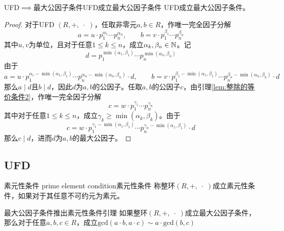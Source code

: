 \begin{lemma}{UFD$\implies$最大公因子条件}{UFD成立最大公因子条件}
	UFD成立最大公因子条件。
\end{lemma}

\begin{proof}
	对于UFD $(R,+,\;\cdot\;)$，任取非零元$a,b\in R$，作唯一完全因子分解
	$$
	a=u\cdot p_1^{\alpha_1}\cdots p_n^{\alpha_n},\qquad 
	b=v\cdot p_1^{\beta_1}\cdots p_n^{\beta_n}
	$$
	其中$u,v$为单位，且对于任意$1\le k\le n$，成立$\alpha_k,\beta_n\in\mathbb{N}$。记
	$$
	d=p_1^{\min(\alpha_1,\beta_1)}\cdots p_n^{\min(\alpha_n,\beta_n)}
	$$
	由于
	$$
	a=u\cdot p_1^{\alpha_1-\min(\alpha_1,\beta_1)}\cdots p_n^{\alpha_n-\min(\alpha_n,\beta_n)}\cdot d,\qquad 
	b=v\cdot p_1^{\beta_1-\min(\alpha_1,\beta_1)}\cdots p_n^{\beta_n-\min(\alpha_n,\beta_n)}\cdot d
	$$
	那么$a\mid d$且$b\mid d$，因此$d$为$a,b$的公因子。任取$a,b$的公因子$c$，由引理\ref{lem:整除的等价条件2}，作唯一完全因子分解
	$$
	c=w\cdot p_1^{\gamma_1}\cdots p_n^{\gamma_n}
	$$
	其中对于任意$1\le k\le n$，成立$\gamma_k\ge \min(\alpha_k,\beta_k)$。由于
	$$
	c=w\cdot p_1^{\gamma_1-\min(\alpha_1,\beta_1)}\cdots p_n^{\gamma_n-\min(\alpha_1,\beta_1)}\cdot d
	$$
	那么$c\mid d$，进而$d$为$a,b$的最大公因子。
\end{proof}

\subsection{UFD}

\begin{definition}{素元性条件 prime element condition}{素元性条件}
	称整环$(R,+,\;\cdot\;)$成立素元性条件，如果对于其任意不可约元为素元。
\end{definition}

\begin{lemma}{}{最大公因子条件推出素元性条件引理}
	如果整环$(R,+,\;\cdot\;)$成立最大公因子条件，那么对于任意$a,b,c\in R$，成立$\mathrm{gcd}(a\cdot b,a\cdot c)\sim a\cdot \mathrm{gcd}(b,c)$
\end{lemma}

